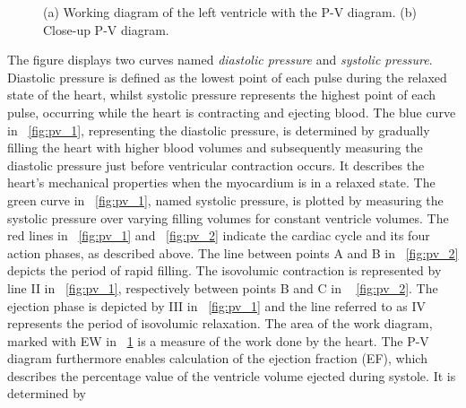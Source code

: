 \begin{figure}[ht]
  \centering
  \caption[P-V diagram \cite{GH20}]{(a) Working diagram of the left ventricle with the P-V diagram. (b) Close-up P-V diagram. \cite{GH20}}
  \label{fig:pv}
\end{figure}
The figure displays two curves named \textit{diastolic pressure} and \textit{systolic pressure}. Diastolic pressure is defined as the lowest point of each pulse during the relaxed state of the heart, whilst systolic pressure represents the highest point of each pulse, occurring while the heart is contracting and ejecting blood. \cite{HKS4}
The blue curve in \figurename~\ref{fig:pv_1}, representing the diastolic pressure, is determined by gradually filling the heart with higher blood volumes and subsequently measuring the diastolic pressure just before ventricular contraction occurs. It describes the heart's mechanical properties when the myocardium is in a relaxed state. The green curve in \figurename~\ref{fig:pv_1}, named systolic pressure, is plotted by measuring the systolic pressure over varying filling volumes for constant ventricle volumes. The red lines in \figurename~\ref{fig:pv_1} and \figurename~\ref{fig:pv_2} indicate the cardiac cycle and its four action phases, as described above. The line between points A and B in \figurename~\ref{fig:pv_2} depicts the period of rapid filling. The isovolumic contraction is represented by line II in \figurename~\ref{fig:pv_1}, respectively between points B and C in \figurename~ \ref{fig:pv_2}. The ejection phase is depicted by III in \figurename~\ref{fig:pv_1} and the line referred to as IV represents the period of isovolumic relaxation. The area of the work diagram, marked with EW in \figurename~\ref{fig:pv} is a measure of the work done by the heart. The P-V diagram furthermore enables calculation of the ejection fraction (EF), which describes the percentage value of the ventricle volume ejected during systole. It is determined by
